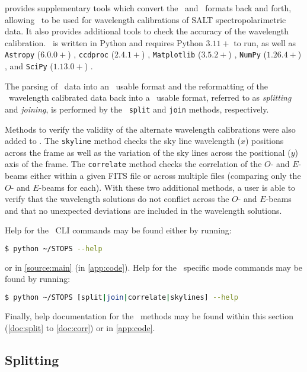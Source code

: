  provides supplementary tools which convert the \polsalt\ and \iraf\ formats back and forth, allowing \iraf\ to be used for wavelength calibrations of \gls{SALT} spectropolarimetric data. It also provides additional tools to check the accuracy of the wavelength calibration.
\stops\ is written in Python and requires Python $3.11+$ to run, as well as \texttt{Astropy} ($6.0.0+$) \citep{astropy:2013, astropy:2018, astropy:2022}, \texttt{ccdproc} ($2.4.1+$) \citep{ccdproc}, \texttt{Matplotlib} ($3.5.2+$) \citep{matplotlib}, \texttt{NumPy} ($1.26.4+$) \citep{numpy}, and \texttt{SciPy} ($1.13.0+$) \citep{scipy}.

The parsing of \polsalt\ data into an \iraf\ usable format and the reformatting of the \iraf\ wavelength calibrated data back into a \polsalt\ usable format, referred to as \textit{splitting} and \textit{joining}, is performed by the \stops\ \texttt{split} and \texttt{join} methods, respectively.

Methods to verify the validity of the alternate wavelength calibrations were also added to \stops. The \texttt{skyline} method checks the sky line wavelength ($x$) positions across the frame as well as the variation of the sky lines across the positional ($y$) axis of the frame. The \texttt{correlate} method checks the correlation of the $O$- and $E$-beams either within a given \gls{FITS} file or across multiple files (comparing only the $O$- and $E$-beams for each). With these two additional methods, a user is able to verify that the wavelength solutions do not conflict across the $O$- and $E$-beams and that no unexpected deviations are included in the wavelength solutions.

Help for the \stops\ \gls{CLI} commands may be found either by running:
\begin{lstlisting}[language=bash]
$ python ~/STOPS --help
\end{lstlisting}
{\parskip=0pt or} in \autoref{source:main} (in \autoref{app:code}).
Help for the \stops\ specific mode commands may be found by running:
\begin{lstlisting}[language=bash]
$ python ~/STOPS [split|join|correlate|skylines] --help
\end{lstlisting}
{\parskip=0pt Finally}, help documentation for the \stops\ methods may be found within this section (\autoref{doc:split} to \ref{doc:corr}) or in \autoref{app:code}.

\subsection{Splitting} \label{subsec:stops_split}

